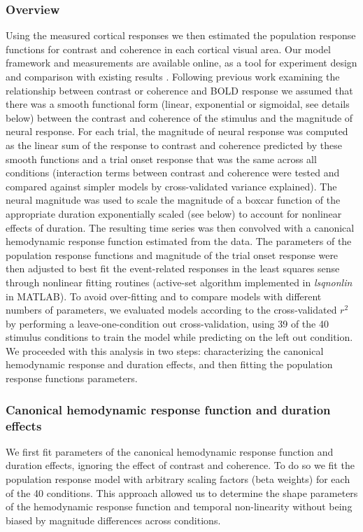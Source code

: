 \documentclass{report}
\begin{document}
\subsubsection{Overview}
Using the measured cortical responses we then estimated the population response functions for contrast and coherence in each cortical visual area. Our model framework and measurements are available online, as a tool for experiment design and comparison with existing results \citep{Birman2018-sp}. Following previous work examining the relationship between contrast or coherence and BOLD response \citep{Avidan2002-jg,Boynton1996-ff,Boynton1999-jd,Gardner2005-pg}
\citep{Heeger2000-pq,Logothetis2001-kk,Olman2004-dd,Rees2000-ul,Tootell1998-mr} we assumed that there was a smooth functional form (linear, exponential or sigmoidal, see details below) between the contrast and coherence of the stimulus and the magnitude of neural response. For each trial, the magnitude of neural response was computed as the linear sum of the response to contrast and coherence predicted by these smooth functions and a trial onset response that was the same across all conditions (interaction terms between contrast and coherence were tested and compared against simpler models by cross-validated variance explained). The neural magnitude was used to scale the magnitude of a boxcar function of the appropriate duration exponentially scaled (see below) to account for nonlinear effects of duration. The resulting time series was then convolved with a canonical hemodynamic response function estimated from the data. The parameters of the population response functions and magnitude of the trial onset response were then adjusted to best fit the event-related responses in the least squares sense through nonlinear fitting routines (active-set algorithm implemented in \textit{lsqnonlin} in MATLAB). To avoid over-fitting and to compare models with different numbers of parameters, we evaluated models according to the cross-validated $r^2$ by performing a leave-one-condition out cross-validation, using 39 of the 40 stimulus conditions to train the model while predicting on the left out condition. We proceeded with this analysis in two steps: characterizing the canonical hemodynamic response and duration effects, and then fitting the population response functions parameters.

\subsubsection{Canonical hemodynamic response function and duration effects}
We first fit parameters of the canonical hemodynamic response function and duration effects, ignoring the effect of contrast and coherence. To do so we fit the population response model with arbitrary scaling factors (beta weights) for each of the 40 conditions. This approach allowed us to determine the shape parameters of the hemodynamic response function and temporal non-linearity without being biased by magnitude differences across conditions.
\end{document}
